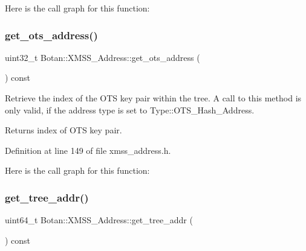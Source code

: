Here is the call graph for this function\+:
\mbox{\label{class_botan_1_1_x_m_s_s___address_a51d64c847fb1ba38a29c24da4b590c83}} 
\subsubsection{\texorpdfstring{get\+\_\+ots\+\_\+address()}{get\_ots\_address()}}
{\footnotesize\ttfamily uint32\+\_\+t Botan\+::\+X\+M\+S\+S\+\_\+\+Address\+::get\+\_\+ots\+\_\+address (\begin{DoxyParamCaption}{ }\end{DoxyParamCaption}) const\hspace{0.3cm}{\ttfamily [inline]}}

Retrieve the index of the O\+TS key pair within the tree. A call to this method is only valid, if the address type is set to Type\+::\+O\+T\+S\+\_\+\+Hash\+\_\+\+Address.

\begin{DoxyReturn}{Returns}
index of O\+TS key pair. 
\end{DoxyReturn}


Definition at line 149 of file xmss\+\_\+address.\+h.

Here is the call graph for this function\+:
\mbox{\label{class_botan_1_1_x_m_s_s___address_ac6ffefc09f01cd25f9acb76f6fcd4071}} 
\subsubsection{\texorpdfstring{get\+\_\+tree\+\_\+addr()}{get\_tree\_addr()}}
{\footnotesize\ttfamily uint64\+\_\+t Botan\+::\+X\+M\+S\+S\+\_\+\+Address\+::get\+\_\+tree\+\_\+addr (\begin{DoxyParamCaption}{ }\end{DoxyParamCaption}) const\hspace{0.3cm}{\ttfamily [inline]}}

